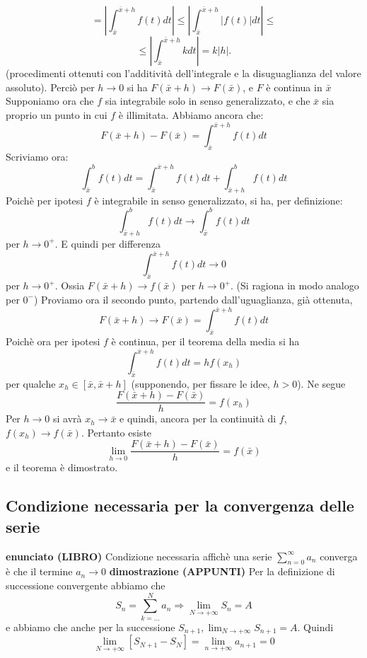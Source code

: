 \documentclass[a4paper, 9pt]{report}
\begin{document}
\[
    = \left| \int_{\bar{x}}^{\bar{x}+h}f(t)dt \right|  \leq \left| \int_{\bar{x}}^{\bar{x}+h}|f(t)|dt \right| \leq
\]
\[
    \leq \left|\int_{\bar{x}}^{\bar{x}+h}kdt\right| = k|h|.
\]
(procedimenti ottenuti con l'additività dell'integrale e la disuguaglianza del valore assoluto). Perciò per $h \rightarrow 0$ si ha $F(\bar{x}+h) \rightarrow  F(\bar{x})$, e $F$ è continua in $\bar{x}$\newline
Supponiamo ora che $f$ sia integrabile solo in senso generalizzato, e che $\bar{x}$ sia proprio un punto in cui $f$ è illimitata. Abbiamo ancora che:
\[
    F(\bar{x}+h) -F(\bar{x}) = \int_{\bar{x}}^{\bar{x}+h}f(t) dt
\]
Scriviamo ora:
\[
    \int_{\bar{x}}^{b}f(t) dt = \int_{\bar{x}}^{\bar{x}+h}f(t) dt + \int_{\bar{x}+h}^{b}f(t) dt
\]
Poichè per ipotesi $f$ è integrabile in senso generalizzato, si ha, per definizione:
\[
    \int_{\bar{x}+h}^{b} f(t)dt \rightarrow \int_{\bar{x}}^{b}f(t) dt
\]
per $h \rightarrow 0^+$.\newline
E quindi per differenza 
\[
    \int_{\bar{x}}^{\bar{x}+h} f(t) dt \rightarrow 0
\]
per $h \rightarrow 0^+$. \newline
Ossia $F(\bar{x}+h) \rightarrow  f(\bar{x})$ per $h \rightarrow 0^+$. (Si ragiona in modo analogo per $0^-$)\newline
\newline
Proviamo ora il secondo punto, partendo dall'uguaglianza, già ottenuta, 
\[
    F(\bar{x}+h) \rightarrow F(\bar{x}) = \int_{\bar{x}}^{\bar{x}+h}f(t)dt
\]
Poichè ora per ipotesi $f$ è continua, per il teorema della media si ha 
\[
    \int_{\bar{x}}^{\bar{x}+h}f(t) dt = hf(x_h)
\]
per qualche $x_h \in[\bar{x},\bar{x}+h]$ (supponendo, per fissare le idee, $h>0$). Ne segue 
\[
    \frac{F(\bar{x}+h)- F(\bar{x})}{h} = f(x_h)
\]
Per $h \rightarrow 0$ si avrà $x_h \rightarrow \bar{x}$ e quindi, ancora per la continuità di $f$, $f(x_h) \rightarrow f(\bar{x})$. Pertanto esiste 
\[
    \lim_{h\rightarrow 0} \frac{F(\bar{x}+h) - F(\bar{x})}{h}= f(\bar{x})
\]
e il teorema è dimostrato.






\newpage
\subsection*{Condizione necessaria per la convergenza delle serie}\textbf{enunciato (LIBRO)}\newline
Condizione necessaria affichè una serie $\sum_{n=0}^{\infty} a_n$ converga è che il termine $a_n \rightarrow 0$\newline
\newline
\textbf{dimostrazione (APPUNTI)}\newline
Per la definizione di successione convergente abbiamo che 
\[
    S_n = \sum_{k=...}^{N}a_n \Rightarrow \lim_{N\rightarrow +\infty}S_n = A
\]
e abbiamo che anche per la successione $S_{n+1}, \lim_{N\rightarrow +\infty} S_{n+1} = A$. Quindi
\[
    \lim_{N\rightarrow +\infty}[S_{N+1} - S_N] = \lim_{n\rightarrow +\infty} a_{n+1} = 0
\] 
\end{document}
